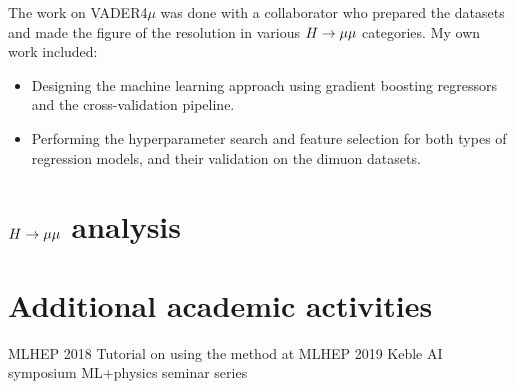 The work on VADER4$\mu$ was done with a collaborator who
prepared the datasets and made the figure of the resolution
in various $H \rightarrow \mu\mu$ categories. My own work included:
\begin{itemize}
\item Designing the machine learning approach using 
gradient boosting regressors and the cross-validation
pipeline.
\item Performing the hyperparameter search and feature
selection for both types of regression models, and
their validation on the dimuon datasets.
\end{itemize}

\section*{$H \rightarrow \mu\mu$ analysis}




\section*{Additional academic activities}



MLHEP 2018
Tutorial on using the method at MLHEP 2019
Keble AI symposium
ML+physics seminar series

















